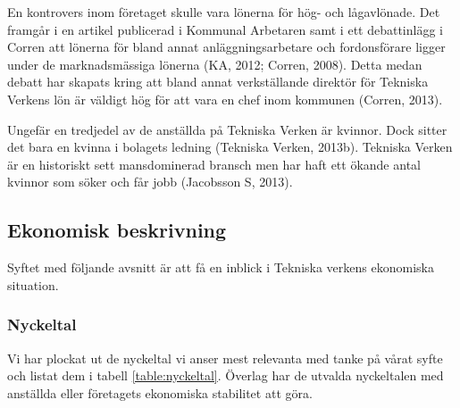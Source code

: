 \documentclass[10pt,a4paper]{article}
\begin{document}
En kontrovers inom företaget skulle vara lönerna för hög- och
lågavlönade. Det framgår i en artikel publicerad i Kommunal Arbetaren samt i ett
debattinlägg i Corren att lönerna för bland annat anläggningsarbetare
och fordonsförare ligger under de marknadsmässiga lönerna (KA, 2012;
Corren, 2008). Detta medan debatt har skapats kring att bland annat
verkställande direktör för Tekniska Verkens lön är väldigt hög för att vara
en chef inom kommunen (Corren, 2013).

Ungefär en tredjedel av de anställda på Tekniska Verken är
kvinnor. Dock sitter det bara en kvinna i bolagets ledning
(Tekniska Verken, 2013b). Tekniska Verken är en historiskt sett mansdominerad bransch men har haft ett ökande antal kvinnor som söker och får jobb
(Jacobsson S, 2013).  
\subsection{Ekonomisk beskrivning}
Syftet med följande avsnitt är att få en inblick i Tekniska verkens ekonomiska
situation.

\subsubsection{Nyckeltal}
Vi har plockat ut de nyckeltal vi anser mest relevanta med tanke på vårat syfte och listat dem i tabell \ref{table:nyckeltal}. Överlag har de utvalda nyckeltalen med anställda eller företagets ekonomiska stabilitet att göra.
\end{document}
